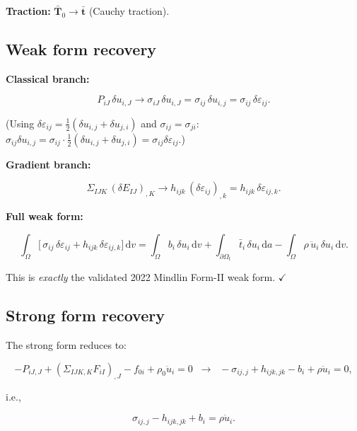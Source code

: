 \documentclass[11pt]{article}
\begin{document}
\textbf{Traction:}
$\bar{\mathbf{T}}_{0} \to \bar{\mathbf{t}}$ (Cauchy traction).

\subsection{Weak form recovery}

\textbf{Classical branch:}

\begin{equation}
P_{iJ}\,\delta u_{i,J} \to \sigma_{iJ}\,\delta u_{i,J}
= \sigma_{ij}\,\delta u_{i,j} = \sigma_{ij}\,\delta\varepsilon_{ij}.
\end{equation}

(Using $\delta\varepsilon_{ij}=\tfrac12(\delta u_{i,j}+\delta u_{j,i})$
and $\sigma_{ij}=\sigma_{ji}$:
$\sigma_{ij}\delta u_{i,j}
= \sigma_{ij}\cdot\tfrac12(\delta u_{i,j}+\delta u_{j,i})
= \sigma_{ij}\delta\varepsilon_{ij}$.)

\textbf{Gradient branch:}

\begin{equation}
\Sigma_{IJK}\,(\delta E_{IJ})_{,K}
\to h_{ijk}\,(\delta\varepsilon_{ij})_{,k}
= h_{ijk}\,\delta\varepsilon_{ij,k}.
\end{equation}

\textbf{Full weak form:}

\begin{equation}
\boxed{
\int_{\Omega}
\bigl[\,\sigma_{ij}\,\delta\varepsilon_{ij}
+ h_{ijk}\,\delta\varepsilon_{ij,k}\bigr]\,
\mathrm{d}v
= \int_{\Omega} b_{i}\,\delta u_{i}\,\mathrm{d}v
+ \int_{\partial\Omega_{t}} \bar{t}_{i}\,\delta u_{i}\,
  \mathrm{d}a
- \int_{\Omega} \rho\,\ddot{u}_{i}\,\delta u_{i}\,\mathrm{d}v.
}
\end{equation}

This is \emph{exactly} the validated 2022 Mindlin Form-II weak form.
$\checkmark$

\subsection{Strong form recovery}

The strong form reduces to:

\begin{equation}
-P_{iJ,J}+(\Sigma_{IJK,K}F_{iI})_{,J}-f_{0i}+\rho_{0}\ddot{u}_{i}=0
\;\;\to\;\;
-\sigma_{ij,j}+h_{ijk,jk}-b_{i}+\rho\ddot{u}_{i}=0,
\end{equation}

i.e.,

\begin{equation}
\sigma_{ij,j}-h_{ijk,jk}+b_{i} = \rho\ddot{u}_{i}.
\end{equation}
\end{document}
